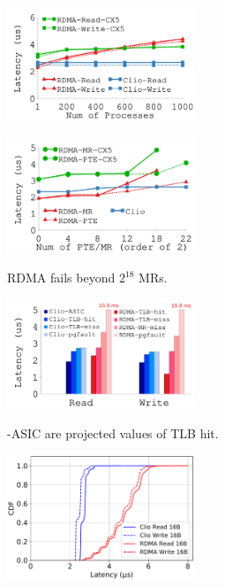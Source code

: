 {
\begin{figure}[th]
\begin{center}
\centerline{\includegraphics[width=0.5\textwidth]{clio/Figures/g_plot_scalability_conn.pdf}}
{
}
\end{center}
\end{figure}
}
{
\begin{figure}[h]
\begin{center}
\centerline{\includegraphics[width=0.5\textwidth]{clio/Figures/g_plot_scalability_pte.pdf}}
{
RDMA fails beyond $2^{18}$ MRs. 
}
\end{center}
\end{figure}
}
{
\begin{figure}[h]
\begin{center}
\centerline{\includegraphics[width=0.5\textwidth]{clio/Figures/g_plot_latency_comparison.pdf}}
{
\sys-ASIC are projected values of TLB hit.
}
\end{center}
\end{figure}
}
{
\begin{figure}[h]
\begin{center}
\centerline{\includegraphics[width=0.5\textwidth]{clio/Figures/clio_rdma_lat_cdf.pdf}}
{
}
\end{center}
\end{figure}
}
